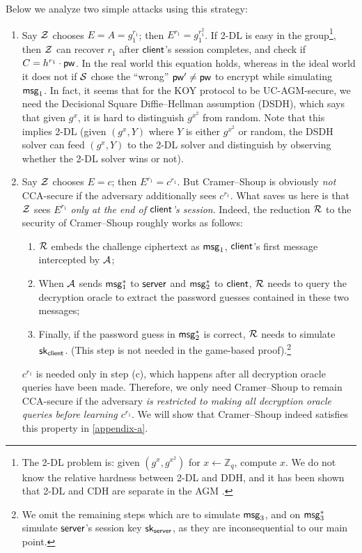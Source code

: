 Below we analyze two simple attacks using this strategy:
\begin{enumerate}
	\item Say $\mathcal{Z}$ chooses $E = A = g_1^{r_1}$; then $E^{r_1} = g_1^{r_1^2}$. If 2-DL is easy in the group\footnote{The 2-DL problem is: given $(g^x,g^{x^2})$ for $x \gets \mathbb{Z}_q$, compute $x$. We do not know the relative hardness between 2-DL and DDH, and it has been shown that 2-DL and CDH are separate in the AGM \cite{C:BauFucLos20}.}, then $\mathcal{Z}$ can recover $r_1$ after $\mathsf{client}$'s session completes, and check if $C = h^{r_1} \cdot \mathsf{pw}$. In the real world this equation holds, whereas in the ideal world it does not if $\mathcal{S}$ chose the ``wrong'' $\mathsf{pw}' \neq \mathsf{pw}$ to encrypt while simulating $\mathsf{msg}_{1}$. In fact, it seems that for the KOY protocol to be UC-AGM-secure, we need the Decisional Square Diffie--Hellman assumption (DSDH), which says that given $g^x$, it is hard to distinguish $g^{x^2}$ from random. Note that this implies 2-DL (given $(g^x,Y)$ where $Y$ is either $g^{x^2}$ or random, the DSDH solver can feed $(g^x,Y)$ to the 2-DL solver and distinguish by observing whether the 2-DL solver wins or not).
	\item Say $\mathcal{Z}$ chooses $E = c$; then $E^{r_1} = c^{r_1}$. But Cramer--Shoup is obviously \emph{not} CCA-secure if the adversary additionally sees $c^{r_1}$. What saves us here is that $\mathcal{Z}$ sees $E^{r_1}$ \emph{only at the end of $\mathsf{client}$'s session}. Indeed, the reduction $\mathcal{R}$ to the security of Cramer--Shoup roughly works as follows:
	\begin{enumerate}
		\item $\mathcal{R}$ embeds the challenge ciphertext as $\mathsf{msg}_{1}$, $\mathsf{client}$'s first message intercepted by $\mathcal{A}$;
		\item When $\mathcal{A}$ sends $\mathsf{msg}_{1}^*$ to $\mathsf{server}$ and $\mathsf{msg}_{2}^*$ to $\mathsf{client}$, $\mathcal{R}$ needs to query the decryption oracle to extract the password guesses contained in these two messages;
		\item Finally, if the password guess in $\mathsf{msg}_{2}^*$ is correct, $\mathcal{R}$ needs to simulate $\mathsf{sk}_{\mathsf{client}}$. (This step is not needed in the game-based proof).\footnote{We omit the remaining steps which are to simulate $\mathsf{msg}_{3}$, and on $\mathsf{msg}_{3}^*$ simulate $\mathsf{server}$'s session key $\mathsf{sk}_{\mathsf{server}}$, as they are inconsequential to our main point.}
	\end{enumerate}
	$c^{r_1}$ is needed only in step (c), which happens after all decryption oracle queries have been made. Therefore, we only need Cramer--Shoup to remain CCA-secure if the adversary \emph{is restricted to making all decryption oracle queries before learning $c^{r_1}$}. We will show that Cramer--Shoup indeed satisfies this property in \cref{appendix-a}.

\end{enumerate}

